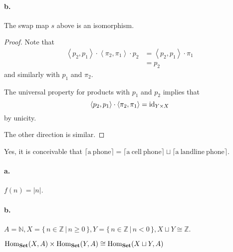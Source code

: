 \paragraph{b.}
\begin{thm}
  The swap map $s$ above is an isomorphism.
\end{thm}
\begin{proof}
  Note that
  \begin{align*}
    \left\langle p_2 , p_1 \right\rangle \cdot
    \left\langle \pi_2 , \pi_1 \right\rangle \cdot
    p_2
    &= \left\langle p_2 , p_1 \right\rangle \cdot
      \pi_1 \\
    &= p_2
  \end{align*}
  and similarly with $p_1$ and $\pi_2$.

  The universal property for products with
  $p_1$ and $p_2$ implies that
  \begin{equation*}
    \left\langle p_2 , p_1 \right\rangle \cdot
    \left\langle \pi_2 , \pi_1 \right\rangle =
    \mathrm{id}_{Y \times X}
  \end{equation*}
  by unicity.

  The other direction is similar.
\end{proof}


Yes, it is conceivable that
$\lceil\mathrm{a\ phone}\rceil =
\lceil\mathrm{a\ cell\ phone}\rceil \sqcup
\lceil\mathrm{a\ landline\ phone}\rceil$.


\paragraph{a.}
$f(n) = \lvert n \rvert$.
\paragraph{b.}
$A = \mathbb{N},
X = \{\,n \in \mathbb{Z} \,\vert\, n \geqslant 0\,\},
Y = \{\,n \in \mathbb{Z} \,\vert\, n < 0\,\},
X \sqcup Y \cong \mathbb{Z}$.


$\mathrm{Hom}_{\mathbf{Set}}(X,A) \times \mathrm{Hom}_{\mathbf{Set}}(Y,A) \cong \mathrm{Hom}_{\mathbf{Set}}(X \sqcup Y,A)$


